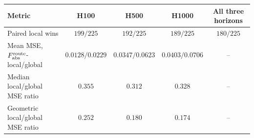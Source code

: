 \begin{tabular}{lcccc}
\toprule
Metric & H100 & H500 & H1000 & All three horizons \\
\midrule
Paired local wins & $199/225$ & $192/225$ & $189/225$ & $180/225$ \\
Mean MSE, \(F_{\rm abs}^{\rm route}\)-local/global & $0.0128/0.0229$ & $0.0347/0.0623$ & $0.0403/0.0706$ & -- \\
Median local/global MSE ratio & $0.355$ & $0.312$ & $0.328$ & -- \\
Geometric local/global MSE ratio & $0.252$ & $0.180$ & $0.174$ & -- \\
\bottomrule
\end{tabular}
